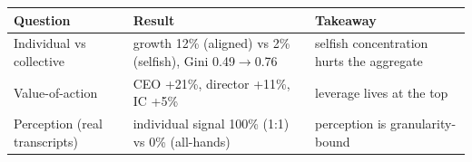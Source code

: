 \begin{tabular}{lll}
\toprule
Question & Result & Takeaway \\
\midrule
Individual vs collective & growth 12\% (aligned) vs 2\% (selfish), Gini 0.49$\to$0.76 & selfish concentration hurts the aggregate \\
Value-of-action & CEO +21\%, director +11\%, IC +5\% & leverage lives at the top \\
Perception (real transcripts) & individual signal 100\% (1:1) vs 0\% (all-hands) & perception is granularity-bound \\
\bottomrule
\end{tabular}

